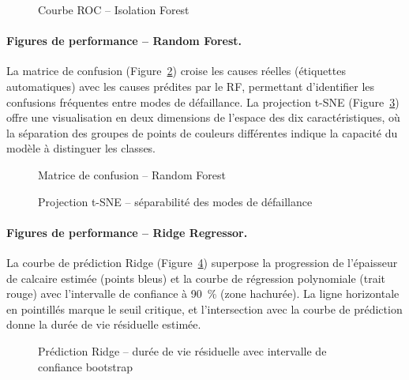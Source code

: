 \begin{figure}[htbp]
  \centering
  \caption{Courbe ROC -- Isolation Forest}
  \label{fig:roc_if}
\end{figure}

\paragraph{Figures de performance -- Random Forest.}
La matrice de confusion (Figure~\ref{fig:confusion_rf}) croise les causes réelles (étiquettes automatiques) avec les causes prédites par le RF, permettant d'identifier les confusions fréquentes entre modes de défaillance. La projection t-SNE (Figure~\ref{fig:tsne}) offre une visualisation en deux dimensions de l'espace des dix caractéristiques, où la séparation des groupes de points de couleurs différentes indique la capacité du modèle à distinguer les classes.

\begin{figure}[htbp]
  \centering
  \caption{Matrice de confusion -- Random Forest}
  \label{fig:confusion_rf}
\end{figure}

\begin{figure}[htbp]
  \centering
  \caption{Projection t-SNE -- séparabilité des modes de défaillance}
  \label{fig:tsne}
\end{figure}

\paragraph{Figures de performance -- Ridge Regressor.}
La courbe de prédiction Ridge (Figure~\ref{fig:ridge_curves}) superpose la progression de l'épaisseur de calcaire estimée (points bleus) et la courbe de régression polynomiale (trait rouge) avec l'intervalle de confiance à 90~\% (zone hachurée). La ligne horizontale en pointillés marque le seuil critique, et l'intersection avec la courbe de prédiction donne la durée de vie résiduelle estimée.

\begin{figure}[htbp]
  \centering
  \caption{Prédiction Ridge -- durée de vie résiduelle avec intervalle de confiance bootstrap}
  \label{fig:ridge_curves}
\end{figure}


